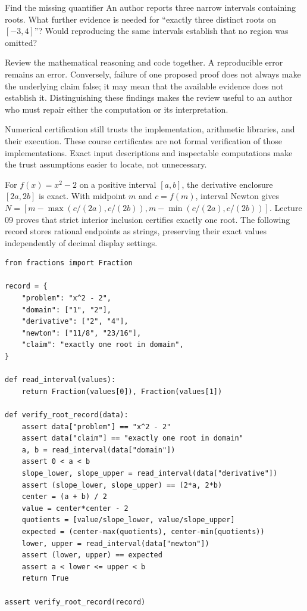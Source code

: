 \begin{question}{Find the missing quantifier}
An author reports three narrow intervals containing roots. What further
evidence is needed for ``exactly three distinct roots on $[-3,4]$''?
Would reproducing the same intervals establish that no region was omitted?
\end{question}

Review the mathematical reasoning and code together. A reproducible error
remains an error. Conversely, failure of one proposed proof does not always
make the underlying claim false; it may mean that the available evidence
does not establish it. Distinguishing these findings makes the review useful
to an author who must repair either the computation or its interpretation.

Numerical certification still trusts the implementation, arithmetic libraries,
and their execution. These course certificates are not formal verification
of those implementations. Exact input descriptions and inspectable computations
make the trust assumptions easier to locate, not unnecessary.

\newpage
{}
For $f(x)=x^2-2$ on a positive interval $[a,b]$, the derivative enclosure
$[2a,2b]$ is exact. With midpoint $m$ and $c=f(m)$, interval Newton gives
$N=[m-\max(c/(2a),c/(2b)),m-\min(c/(2a),c/(2b))]$.
Lecture 09 proves that strict interior inclusion certifies exactly one root.
The following record stores rational endpoints as strings, preserving their
exact values independently of decimal display settings.
\begin{lstlisting}
from fractions import Fraction

record = {
    "problem": "x^2 - 2",
    "domain": ["1", "2"],
    "derivative": ["2", "4"],
    "newton": ["11/8", "23/16"],
    "claim": "exactly one root in domain",
}

def read_interval(values):
    return Fraction(values[0]), Fraction(values[1])

def verify_root_record(data):
    assert data["problem"] == "x^2 - 2"
    assert data["claim"] == "exactly one root in domain"
    a, b = read_interval(data["domain"])
    assert 0 < a < b
    slope_lower, slope_upper = read_interval(data["derivative"])
    assert (slope_lower, slope_upper) == (2*a, 2*b)
    center = (a + b) / 2
    value = center*center - 2
    quotients = [value/slope_lower, value/slope_upper]
    expected = (center-max(quotients), center-min(quotients))
    lower, upper = read_interval(data["newton"])
    assert (lower, upper) == expected
    assert a < lower <= upper < b
    return True

assert verify_root_record(record)
\end{lstlisting}

